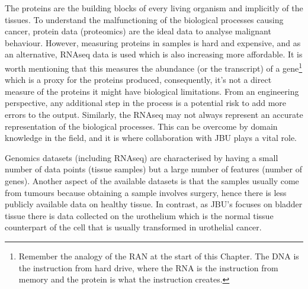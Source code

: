 \vspace{3mm}
\vspace{3mm}

The proteins are the building blocks of every living organism and implicitly of the tissues. To understand the malfunctioning of the biological processes causing cancer, protein data (proteomics) are the ideal data to analyse malignant behaviour. However, measuring proteins in samples is hard and expensive, and as an alternative, RNAseq data is used which is also increasing more affordable. It is worth mentioning that this measures the abundance (or the transcript) of a gene\footnote{Remember the analogy of the RAN at the start of this Chapter. The DNA is the instruction from hard drive, where the RNA is the instruction from memory and the protein is what the instruction creates.} which is a proxy for the proteins produced, consequently, it's not a direct measure of the proteins it might have biological limitations. From an engineering perspective, any additional step in the process is a potential risk to add more errors to the output. Similarly, the RNAseq may not always represent an accurate representation of the biological processes. This can be overcome by domain knowledge in the field, and it is where collaboration with JBU plays a vital role.

Genomics datasets (including RNAseq) are characterised by having a small number of data points (tissue samples) but a large number of features (number of genes). Another aspect of the available datasets is that the samples usually come from tumours because obtaining a sample involves surgery, hence there is less publicly available data on healthy tissue. In contrast, as JBU's focuses on bladder tissue there is data collected on the urothelium which is the normal tissue counterpart of the cell that is usually transformed in urothelial cancer.

